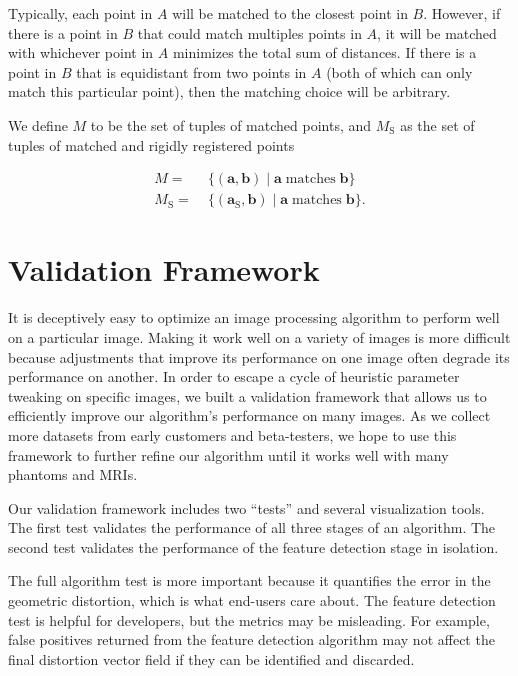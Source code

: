 \documentclass[12pt]{article}
\begin{document}
Typically, each point in $A$ will be matched to the closest point in $B$. However, if there is a point in $B$ that could match multiples points in $A$, it will be matched with whichever point in $A$ minimizes the total sum of distances.  If there is a point in $B$ that is equidistant from two points in $A$ (both of which can only match this particular point), then the matching choice will be arbitrary.

We define $M$ to be the set of tuples of matched points, and $M_\textrm{S}$ as the set of tuples of matched and rigidly registered points

$$
\begin{align*}
M =& \; \{ (\mathbf{a}, \mathbf{b}) \; | \; \mathbf{a} \; \textrm{matches} \; \mathbf{b} \} \\
M_\textrm{S} =& \; \{ (\mathbf{a}_\textrm{S}, \mathbf{b}) \; | \; \mathbf{a} \; \textrm{matches} \; \mathbf{b} \}.
\end{align*}
$$

\section{Validation Framework}

It is deceptively easy to optimize an image processing algorithm to perform well on a particular image. Making it work well on a variety of images is more difficult because adjustments that improve its performance on one image often degrade its performance on another.  In order to escape a cycle of heuristic parameter tweaking on specific images, we built a validation framework that allows us to efficiently improve our algorithm's performance on many images.  As we collect more datasets from early customers and beta-testers, we hope to use this framework to further refine our algorithm until it works well with many phantoms and MRIs.

Our validation framework includes two ``tests'' and several visualization tools.  The first test validates the performance of all three stages of an algorithm.  The second test validates the performance of the feature detection stage in isolation.

The full algorithm test is more important because it quantifies the error in the geometric distortion, which is what end-users care about.  The feature detection  test is helpful for developers, but the metrics may be misleading.  For example, false positives returned from the feature detection algorithm may not affect the final distortion vector field if they can be identified and discarded.
\end{document}
